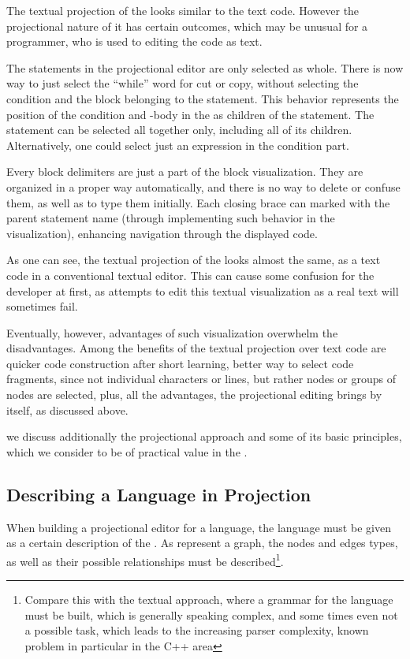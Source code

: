 The textual projection of the  looks similar to the text code. However the projectional 
nature of it has certain outcomes, which may be unusual for a programmer, who is used to editing
the code as text.

The statements in the projectional editor are only selected as whole. There is now way to just select 
the ``while'' word for cut or copy, without selecting the condition and the block belonging to the statement. 
This behavior represents the position of the condition and -body in the  as children of the  
statement. The statement can be selected all together only, including all of its children. Alternatively, one could 
select just an expression in the condition part.

Every block delimiters are just a part of the block visualization. They are organized in a proper way
automatically, and there is no way to delete or confuse them, as well as to type them initially. Each
closing brace can marked with the parent statement name (through implementing such behavior in the
 visualization), enhancing navigation through the displayed code.

As one can see, the textual projection of the  looks almost the same, as a text code in a 
conventional textual editor. This can cause some confusion for the developer at first, 
as attempts to edit this textual visualization as a real text will sometimes fail. 

Eventually, however, advantages of such visualization overwhelm the disadvantages. 
Among the benefits of the textual projection over text code are quicker code construction 
after short learning, better way to select code fragments, since not individual 
characters or lines, but rather  nodes or groups of nodes are selected, 
plus, all the advantages, the projectional editing brings by itself, as discussed above.

we discuss additionally the projectional approach and some of its basic 
principles, which we consider to be of practical value in the .


\subsection{Describing a Language in Projection}

When  building a projectional editor for a language, the language must be given as a certain description of the .
As  represent a graph, the nodes and edges types, as well as their possible relationships must be described\footnote{Compare this
with the textual approach, where a grammar for the language must be built, which is generally speaking complex, and some times even not a
possible task, which leads to the increasing parser complexity, known problem in particular in the C++ area}. 

